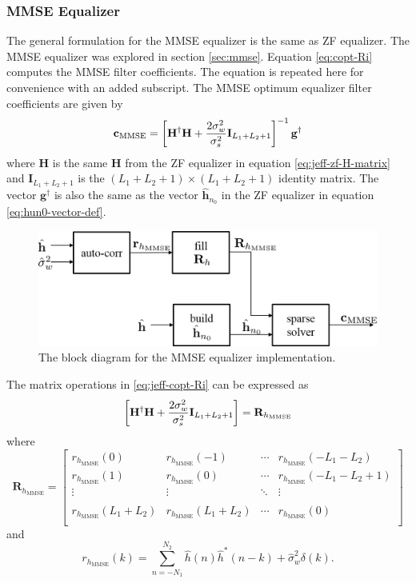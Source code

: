 \subsubsection{MMSE Equalizer}
The general formulation for the MMSE equalizer is the same as ZF equalizer.
The MMSE equalizer was explored in section \ref{sec:mmse}.
Equation \eqref{eq:copt-Ri} computes the MMSE filter coefficients.
The equation is repeated here for convenience with an added subscript.
The MMSE optimum equalizer filter coefficients are given by
\begin{equation}
	\mathbf{c}_\text{MMSE} = \left[ \vphantom{\sum} \mathbf{H}^\dag\mathbf{H} + %
	\frac{2\sigma^2_w}{\sigma^2_s}
	\mathbf{I}_{L_1+L_2+1} \right]^{-1}
	\mathbf{g}^\dag
	\label{eq:jeff-copt-Ri}
\end{equation}
where $\mathbf{H}$ is the same $\mathbf{H}$ from the ZF equalizer in equation \eqref{eq:jeff-zf-H-matrix} and $\mathbf{I}_{L_1+L_2+1}$ is the $(L_1+L_2+1)\times(L_1+L_2+1)$ identity matrix.
The vector $\mathbf{g}^\dag$ is also the same as the vector $\hat{\mathbf{h}}_{n_0}$ in the ZF equalizer in equation \eqref{eq:hun0-vector-def}.
\begin{figure}
	\centering\includegraphics[width=\textwidth/10*8]{figures/gpu/MMSEblock.png}
	\caption{The block diagram for the MMSE equalizer implementation.}
	\label{fig:MMSEblock}
\end{figure}
The matrix operations in \eqref{eq:jeff-copt-Ri} can be expressed as
\begin{equation}
\left[\vphantom{\sum} \mathbf{H}^\dag\mathbf{H} + %
	\frac{2\sigma^2_w}{\sigma^2_s}
	\mathbf{I}_{L_1+L_2+1}\right] = \mathbf{R}_{h_\text{MMSE}}
\end{equation}
where
\begin{equation}
\mathbf{R}_{h_\text{MMSE}} = 
		\begin{bmatrix}
		r_{h_\text{MMSE}}(0)				 & r_{h_\text{MMSE}}(-1) 			& \cdots & r_{h_\text{MMSE}}(-L_1-L_2)	\\
		r_{h_\text{MMSE}}(1) 		& r_{h_\text{MMSE}}(0)& \cdots & r_{h_\text{MMSE}}(-L_1-L_2+1)		\\
		\vdots 				& \vdots 			& \ddots & \vdots  			\\
		\\
		r_{h_\text{MMSE}}(L_1+L_2) & r_{h_\text{MMSE}}(L_1+L_2)	& \cdots & r_{h_\text{MMSE}}(0)		\\
	\end{bmatrix}
\end{equation}
and
\begin{equation}
r_{h_\text{MMSE}}(k) = \sum_{n=-N_1}^{N_2} \hat{h}(n)\hat{h}^\ast(n-k) + \hat{\sigma}_w^2 \delta(k).
\end{equation}

